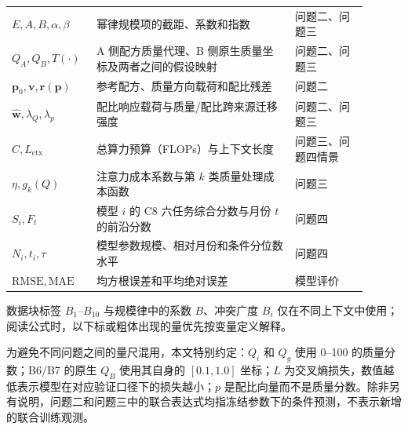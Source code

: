 \begin{table}[htbp]
\begin{tabular}{p{0.19\linewidth}p{0.52\linewidth}p{0.19\linewidth}}
    $E,A,B,\alpha,\beta$ & 幂律规模项的截距、系数和指数 & 问题二、问题三 \\
    $Q_A,Q_B,T(\cdot)$ & A 侧配方质量代理、B 侧原生质量坐标及两者之间的假设映射 & 问题二、问题三 \\
    $\boldsymbol p_0,\boldsymbol v,\boldsymbol r(\boldsymbol p)$ & 参考配方、质量方向载荷和配比残差 & 问题二 \\
    $\widehat{\boldsymbol w},\lambda_Q,\lambda_p$ & 配比响应载荷与质量/配比跨来源迁移强度 & 问题二、问题三 \\
    $C,L_{\mathrm{ctx}}$ & 总算力预算（FLOPs）与上下文长度 & 问题三、问题四情景 \\
    $\eta,g_k(Q)$ & 注意力成本系数与第 $k$ 类质量处理成本函数 & 问题三 \\
    $S_i,F_t$ & 模型 $i$ 的 C8 六任务综合分数与月份 $t$ 的前沿分数 & 问题四 \\
    $N_i,t_i,\tau$ & 模型参数规模、相对月份和条件分位数水平 & 问题四 \\
    $\mathrm{RMSE},\mathrm{MAE}$ & 均方根误差和平均绝对误差 & 模型评价 \\
    \bottomrule
  \end{tabular}
\end{table}

数据块标签 $B_1$--$B_{10}$ 与规模律中的系数 $B$、冲突广度 $B_i$ 仅在不同上下文中使用；阅读公式时，以下标或粗体出现的量优先按变量定义解释。

为避免不同问题之间的量尺混用，本文特别约定：$Q_i$ 和 $Q_g$ 使用 0--100 的质量分数；B6/B7 的原生 $Q_B$ 使用其自身的 $[0.1,1.0]$ 坐标；$L$ 为交叉熵损失，数值越低表示模型在对应验证口径下的损失越小；$p$ 是配比向量而不是质量分数。除非另有说明，问题二和问题三中的联合表达式均指冻结参数下的条件预测，不表示新增的联合训练观测。

